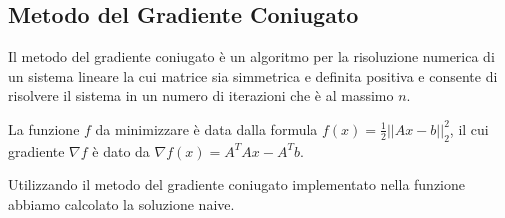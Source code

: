 {\color{oorange}\subsection{Metodo del Gradiente Coniugato}}
Il metodo del gradiente coniugato è un algoritmo per la risoluzione numerica di un sistema lineare la cui matrice 
sia simmetrica e definita positiva
 e consente di risolvere il sistema in un numero di iterazioni che è al massimo $n$.

La funzione $f$ da minimizzare è data dalla formula
  $f(x) = \frac{1}{2} ||Ax - b||_2^2 $, il cui gradiente $\nabla f$ è dato da
$\nabla f(x) = A^TAx - A^Tb  $.

Utilizzando il metodo del gradiente coniugato implementato nella funzione 
 abbiamo calcolato la soluzione naive.

